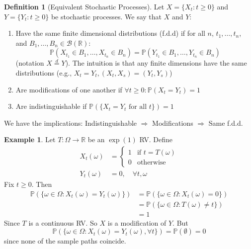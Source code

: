 \documentclass[11pt,a4paper]{article}
\theoremstyle{definition}
\newtheorem{definition}{Definition}[section]
\newtheorem{example}{Example}[section]
\begin{document}
\begin{definition}[Equivalent Stochastic Processes]\label{def:equiv_processes}
Let $X = \{X_t : t \geq 0\}$ and $Y = \{Y_t : t \geq 0\}$ be stochastic processes. We say that $X$ and $Y$:
\begin{enumerate}
    \item Have the same finite dimensional distributions (f.d.d) if for all $n$, $t_1, \ldots, t_n$, and $B_1, \ldots, B_n \in \mathcal{B}(\mathbb{R})$:
    \[
    \mathbb{P}(X_{t_1} \in B_1, \ldots, X_{t_n} \in B_n) = \mathbb{P}(Y_{t_1} \in B_1, \ldots, Y_{t_n} \in B_n)
    \]
    (notation $X \stackrel{d}{=}Y$). The intuition is that any finite dimensions have the same distributions (e.g., $X_t = Y_t, (X_t, X_s) = (Y_t, Y_s)$)
    
    \item Are modifications of one another if $\forall t \geq 0: \mathbb{P}(X_t = Y_t) = 1$
    
    \item Are indistinguishable if $\mathbb{P}(\{X_t = Y_t \text{ for all } t\}) = 1$
\end{enumerate}
\end{definition}
\noindent
We have the implications: Indistinguishable $\Rightarrow$ Modifications $\Rightarrow$ Same f.d.d.

\begin{example}
    Let $T: \Omega \to \mathbb{R}$ be an $\exp (1)$ RV. Define \begin{align*}
        X_t (\omega) & = \begin{cases}
            1 & \text{if } t = T(\omega) \\ 0 & \text{otherwise}
        \end{cases} \\ Y_t(\omega) & = 0, \quad \forall t,\omega
    \end{align*}
    Fix $t \ge 0$. Then \begin{align*}
        \mathbb{P} (\{\omega \in \Omega : X_t(\omega ) = Y_t(\omega)\}) & = \mathbb{P} (\{\omega \in \Omega: X_t(\omega) = 0\}) \\ & = \mathbb{P} (\{\omega \in \Omega:T(\omega )\ne t\}) \\ & =1
    \end{align*}
    Since $T$ is a continuous RV. So $X$ is a modification of $Y$. But \[
    \mathbb{P} (\{\omega \in \Omega : X_t(\omega ) = Y_t(\omega), \forall t\}) = \mathbb{P}(\emptyset) = 0
    \]
    since none of the sample paths coincide.
\end{example}
\end{document}
